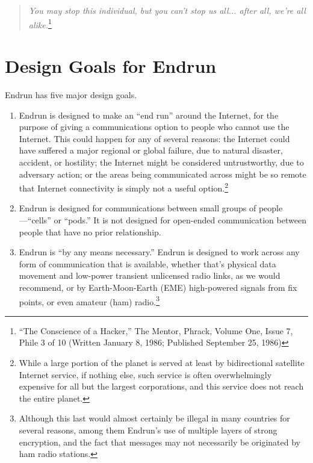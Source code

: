 \documentclass[12pt]{article}
\begin{document}
  \begin{quote}
    \emph{You may stop this individual, but you can't stop us all... after all, we're all alike.}\footnote{``The Conscience of a Hacker,'' The Mentor, Phrack, Volume One, Issue 7, Phile 3 of 10 (Written January 8, 1986; Published September 25, 1986)}
  \end{quote}
  
  \section{Design Goals for Endrun}
  
  Endrun has five major design goals.
  
  \begin{enumerate}
    \item Endrun is designed to make an ``end run'' around the Internet, for the purpose of giving a communications option to people who cannot use the Internet. This could happen for any of several reasons: the Internet could have suffered a major regional or global failure, due to natural disaster, accident, or hostility; the Internet might be considered untrustworthy, due to adversary action; or the areas being communicated across might be so remote that Internet connectivity is simply not a useful option.\footnote{While a large portion of the planet is served at least by bidirectional satellite Internet service, if nothing else, such service is often overwhelmingly expensive for all but the largest corporations, and this service does not reach the entire planet.}
    
    \item Endrun is designed for communications between small groups of people---``cells'' or ``pods.'' It is not designed for open-ended communication between people that have no prior relationship.
    
    \item Endrun is ``by any means necessary.'' Endrun is designed to work across any form of communication that is available, whether that's physical data movement and low-power transient unlicensed radio links, as we would recommend, or by Earth-Moon-Earth (EME) high-powered signals from fix points, or even amateur (ham) radio.\footnote{Although this last would almost certainly be illegal in many countries for several reasons, among them Endrun's use of multiple layers of strong encryption, and the fact that messages may not necessarily be originated by ham radio stations.}
    

\end{enumerate}
\end{document}
